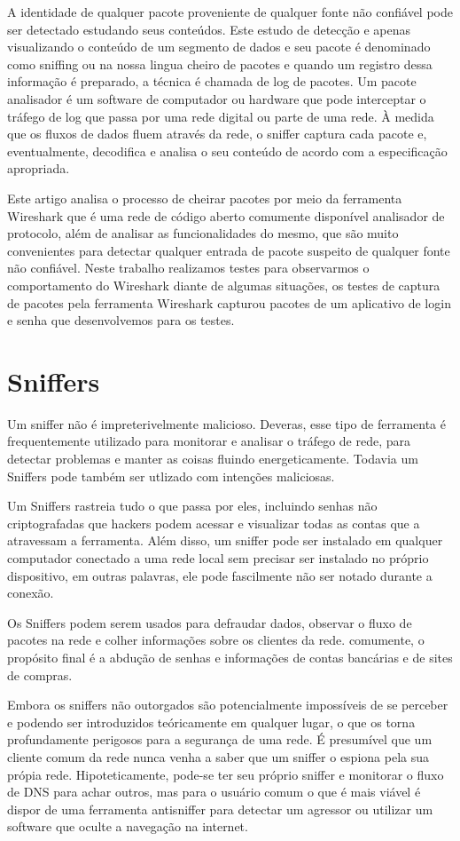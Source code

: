 \documentclass[12pt]{article}
\begin{document}
A identidade de qualquer pacote proveniente de qualquer fonte não confiável pode ser detectado estudando seus conteúdos. Este estudo de detecção e
apenas visualizando o conteúdo de um segmento de dados e seu pacote é
denominado como sniffing  ou  na nossa lingua cheiro de pacotes e quando um registro dessa informação é
preparado, a técnica é chamada de log de pacotes. Um pacote analisador é um software de computador ou hardware que pode interceptar
o tráfego de log que passa por uma rede digital ou parte de uma
rede. À medida que os fluxos de dados fluem através da rede, o sniffer
captura cada pacote e, eventualmente, decodifica e analisa o seu
conteúdo de acordo com a especificação apropriada.

Este artigo analisa o processo de cheirar pacotes por meio da ferramenta Wireshark que é uma rede de código aberto comumente disponível
analisador de protocolo, além de analisar as funcionalidades do mesmo, que são
muito convenientes para detectar qualquer entrada de pacote suspeito de qualquer fonte não confiável. Neste trabalho realizamos testes para observarmos o comportamento do Wireshark diante de algumas situações, os testes de captura de pacotes pela ferramenta Wireshark capturou pacotes de um aplicativo de login e senha que desenvolvemos para os testes.  

\section{Sniffers}
Um sniffer não é impreterivelmente malicioso. Deveras, esse tipo de ferramenta  é  frequentemente utilizado para monitorar e analisar o tráfego de rede, para detectar problemas e manter as coisas fluindo energeticamente. Todavia um Sniffers pode também ser utlizado com intenções maliciosas. 

Um Sniffers rastreia tudo o que passa por eles, incluindo senhas não criptografadas que hackers podem acessar e visualizar todas as contas que a atravessam a ferramenta. Além disso, um sniffer pode ser instalado em qualquer computador conectado a uma rede local sem precisar ser instalado no próprio dispositivo, em outras palavras, ele pode fascilmente não ser notado durante a conexão. 

Os Sniffers podem serem usados para defraudar dados, observar o fluxo de pacotes na rede e colher informações sobre os clientes da rede. comumente, o propósito final é a abdução de senhas e informações de contas bancárias e de sites de compras. 

Embora os sniffers não outorgados são potencialmente impossíveis de se perceber e podendo ser introduzidos teóricamente em  qualquer lugar, o que os torna profundamente perigosos para a segurança de uma rede. É presumível que um cliente comum da rede nunca venha a saber que um sniffer o espiona pela sua própia rede. Hipoteticamente, pode-se ter seu próprio sniffer e monitorar o fluxo de DNS para achar outros, mas para o usuário comum o que é mais  viável é dispor  de uma ferramenta antisniffer para detectar um agressor ou utilizar um software que oculte a navegação na internet.
\end{document}
